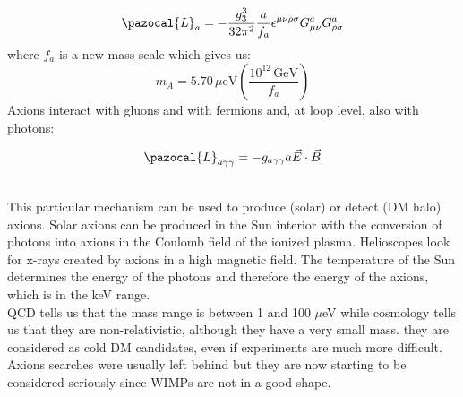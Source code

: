 \documentclass[10.75pt,a4paper,openright,bottom=2cm]{article}
\begin{document}
\[
\pazocal{L}_a=-\frac{g_3^3}{32\pi^2}\frac{a}{f_a}\epsilon^{\mu\nu\rho\sigma}G_{\mu\nu}^aG_{\rho\sigma}^a
\]
where $f_a$ is a new mass scale which gives us:
\[
m_A=5.70\,\text{$\mu$eV}\left(\frac{10^{12}\,\text{GeV}}{f_a}\right)
\]
Axions interact with gluons and with fermions and, at loop level, also with photons:\\
\begin{minipage}{0.5\textwidth}
\begin{center}
\end{center}
\end{minipage}\hspace*{-2cm}
\begin{minipage}{0.5\textwidth}
\[\pazocal{L}_{a\gamma\gamma}=-g_{a\gamma\gamma}a\Vec{E}\cdot\Vec{B}\]
\end{minipage}\\
This particular mechanism can be used to produce (solar) or detect (DM halo) axions. Solar axions can be produced in the Sun interior with the conversion of photons into axions in the Coulomb field of the ionized plasma. Helioscopes look for x-rays created by axions in a high magnetic field. The temperature of the Sun determines the energy of the photons and therefore the energy of the axions, which is in the keV range.\\
QCD tells us that the mass range is between 1 and 100 $\mu$eV while cosmology tells us that they are non-relativistic, although they have a very small mass. they are considered as cold DM candidates, even if experiments are much more difficult. Axions searches were usually left behind but they are now starting to be considered seriously since WIMPs are not in a good shape.
\newpage
\end{document}

